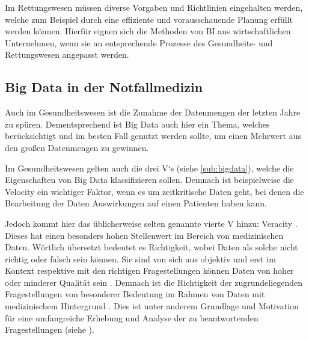 Im Rettungswesen müssen diverse Vorgaben und Richtlinien eingehalten werden, welche zum Beispiel durch eine effiziente und vorausschauende Planung erfüllt werden können.
Hierfür eignen sich die Methoden von \gls{BI} aus wirtschaftlichen Unternehmen, wenn sie an entsprechende Prozesse des Gesundheits- und Rettungswesen angepasst werden.


\subsection{Big Data in der Notfallmedizin}

Auch im Gesundheitswesen ist die Zunahme der Datenmengen der letzten Jahre zu spüren.
Dementsprechend ist \glqq Big Data\grqq{} auch hier ein Thema, welches berücksichtigt und im besten Fall genutzt werden sollte, um einen Mehrwert aus den großen Datenmengen zu gewinnen.

Im Gesundheitswesen gelten auch die drei \glqq V`s\grqq{} (siehe \ref{sub:bigdata}), welche die Eigenschaften von Big Data klassifizieren sollen.
Demnach ist beispielweise die \glqq Velocity\grqq{} ein wichtiger Faktor, wenn es um zeitkritische Daten geht, bei denen die Bearbeitung der Daten Auswirkungen auf einen Patienten haben kann.

Jedoch kommt hier das üblicherweise selten genannte vierte V hinzu: Veracity \cite{Hausler.2018}.
Dieses hat einen besonders hohen Stellenwert im Bereich von medizinischen Daten.
Wörtlich übersetzt bedeutet es \glqq Richtigkeit\grqq{}, wobei Daten als solche nicht richtig oder falsch sein können.
Sie sind von sich aus objektiv und erst im Kontext respektive mit den richtigen Fragestellungen können Daten von hoher oder minderer Qualität sein \cite[S.2 ff]{Gitelman.2013}.
Demnach ist die Richtigkeit der zugrundeliegenden Fragestellungen von besonderer Bedeutung im Rahmen von Daten mit medizinischem Hintergrund \cite[2.1]{Hausler.2018}.
Dies ist unter anderem Grundlage und Motivation für eine umfangreiche Erhebung und Analyse der zu beantwortenden Fragestellungen (siehe ).


